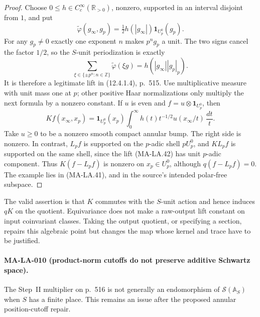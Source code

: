 \begin{proof}
Choose $0\le h\in C_c^\infty(\mathbb R_{>0})$, nonzero,
supported in an interval disjoint from $1$, and put
\[
 \widetilde\varphi(g_\infty,g_p)
       =\tfrac12 h(|g_\infty|)\mathbf1_{U_p^0}(g_p).
 \tag{MA-LA.42}
\]
For any $g_p\ne0$ exactly one exponent $n$ makes
$p^n g_p$ a unit.  The two signs cancel the factor $1/2$,
so the $S$-unit periodization is exactly
\[
       \sum_{\xi\in\{\pm p^n:n\in\mathbb Z\}}
                \widetilde\varphi(\xi g)
                  =h(|g_\infty||g_p|_p).
 \tag{MA-LA.43}
\]
It is therefore a legitimate lift in (12.4.1.4), p.~515.
Use multiplicative measure with unit mass one at $p$;
other positive Haar normalizations only multiply the next
formula by a nonzero constant.  If $u$ is even and
$f=u\otimes\mathbf1_{U_p^0}$, then
\[
       Kf(x_\infty,x_p)
        =\mathbf1_{U_p^0}(x_p)
             \int_0^\infty h(t)t^{-1/2}u(x_\infty/t)\,\frac{dt}{t}.
 \tag{MA-LA.44}
\]
Take $u\ge0$ to be a nonzero smooth compact annular bump.
The right side is nonzero.  In contrast, $L_pf$ is supported
on the $p$-adic shell $pU_p^0$, and $K L_pf$ is supported on
the same shell, since the lift (MA-LA.42) has unit $p$-adic
component.  Thus $K(f-L_pf)$ is nonzero on $x_p\in U_p^0$,
although $q(f-L_pf)=0$.  The example lies in (MA-LA.41),
and in the source's intended polar-free subspace.
\end{proof}

The valid assertion is that $K$ commutes with the $S$-unit
action and hence induces $qK$ on the quotient.  Equivariance
does not make a raw-output lift constant on input coinvariant
classes.  Taking the output quotient, or specifying a section,
repairs this algebraic point but changes the map whose kernel
and trace have to be justified.

\paragraph{MA-LA-010 (product-norm cutoffs do not preserve additive Schwartz space).}
The Step~II multiplier on p.~516 is not generally an
endomorphism of $\mathcal S(\mathbb A_S)$ when $S$ has a
finite place.  This remains an issue after the proposed
annular position-cutoff repair.

